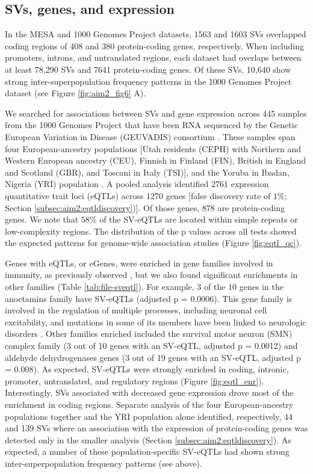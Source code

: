 \documentclass[11pt]{ucscthesis}
\begin{document}
\subsection{SVs, genes, and expression}
In the MESA and 1000 Genomes Project datasets, 1563 and 1603 SVs overlapped coding regions of 408 and 380 protein-coding genes, respectively.
When including promoters, introns, and untranslated regions, each dataset had overlaps between at least 78,290 SVs and 7641 protein-coding genes.
Of these SVs, 10,640 show strong inter-superpopulation frequency patterns in the 1000 Genomes Project dataset (see Figure \ref{fig:aim2_fig6} A).

We searched for associations between SVs and gene expression across 445 samples from the 1000 Genomes Project that have been RNA sequenced by the Genetic European Variation in Disease (GEUVADIS) consortium \cite{geuvadis_2013}.
These samples span four European-ancestry populations [Utah residents (CEPH) with Northern and Western European ancestry (CEU), Finnish in Finland (FIN), British in England and Scotland (GBR), and Toscani in Italy (TSI)], and the Yoruba in Ibadan, Nigeria (YRI) population \cite{geuvadis_2013}.
A pooled analysis identified 2761 expression quantitative trait loci (eQTLs) across 1270 genes [false discovery rate of $1\%$; Section \ref{subsec:aim2:eqtldiscovery})].
Of those genes, 878 are protein-coding genes. We note that $58\%$ of the SV-eQTLs are located within simple repeats or low-complexity regions.
The distribution of the p values across all tests showed the expected patterns for genome-wide association studies (Figure \ref{fig:eqtl_qc}).

Genes with eQTLs, or eGenes, were enriched in gene families involved in immunity, as previously observed \cite{fagny_exploring_2017}, but we also found significant enrichments in other families (Table \ref{tab:file-sveqtl}).
For example, 3 of the 10 genes in the anoctamins family have SV-eQTLs (adjusted p = 0.0006).
This gene family is involved in the regulation of multiple processes, including neuronal cell excitability, and mutations in some of its members have been linked to neurologic disorders \cite{benarroch_2017}.
Other families enriched included the survival motor neuron (SMN) complex family (3 out of 10 genes with an SV-eQTL, adjusted p = 0.0012) and aldehyde dehydrogenases genes (3 out of 19 genes with an SV-eQTL, adjusted p = 0.008).
As expected, SV-eQTLs were strongly enriched in coding, intronic, promoter, untranslated, and regulatory regions (Figure \ref{fig:eqtl_enr}).
Interestingly, SVs associated with decreased gene expression drove most of the enrichment in coding regions.
Separate analysis of the four European-ancestry populations together and the YRI population alone identified, respectively, 44 and 139 SVs where an association with the expression of protein-coding genes was detected only in the smaller analysis (Section \ref{subsec:aim2:eqtldiscovery}).
As expected, a number of these population-specific SV-eQTLs had shown strong inter-superpopulation frequency patterns (see above).
\end{document}
